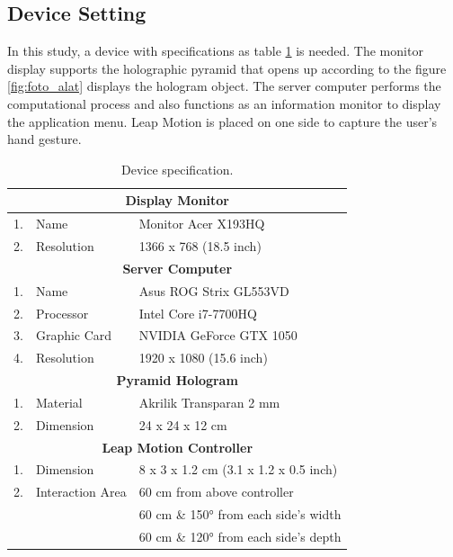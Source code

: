 \documentclass[conference]{IEEEtran}
\begin{document}
	\subsection{Device Setting}
		In this study, a device with specifications as table \ref{fig:spesifikasi_alat} is needed. The monitor display supports the holographic pyramid that opens up according to the figure \ref{fig:foto_alat} displays the hologram object. The server computer performs the computational process and also functions as an information monitor to display the application menu. Leap Motion is placed on one side to capture the user's hand gesture.
		\vspace{-2ex}
		\begin{table}[h]
			\caption{Device specification.}
			\label{fig:spesifikasi_alat}
			\vspace{-2ex}
			\begin{center}
			\begin{tabular}{|l|l|l|}
				\hline
				\multicolumn{3}{|c|}{\textbf{Display Monitor}}                                                       \\ \hline
				1. & Name                  	& Monitor Acer X193HQ                   \\ \hline
				2. & Resolution             & 1366 x 768 (18.5 inch)                \\ \hline
				\multicolumn{3}{|c|}{\textbf{Server Computer}}\\ \hline
				1. & Name                 	& Asus ROG Strix GL553VD                \\ \hline
				2. & Processor			   	& Intel Core i7-7700HQ                  \\ \hline
				3. & Graphic Card			& NVIDIA GeForce GTX 1050               \\ \hline
				4. & Resolution             & 1920 x 1080 (15.6 inch)               \\ \hline
				\multicolumn{3}{|c|}{\textbf{Pyramid Hologram}} \\ \hline
				1. & Material              	& Akrilik Transparan 2 mm                    \\ \hline
				2. & Dimension              & 24 x 24 x 12 cm                        \\ \hline
				\multicolumn{3}{|c|}{\textbf{Leap Motion Controller}}\\ \hline
				1. & Dimension				& 8 x 3 x 1.2 cm (3.1 x 1.2 x 0.5 inch) \\ \hline
				2. & Interaction Area		& 60 cm from above controller  \\ \cline{3-3} 
				   &                       & 60 cm \& 150° from each side's width \\ \cline{3-3} 
				   &                       & 60 cm \& 120° from each side's depth\\ \hline
			\end{tabular}
			\end{center}
		\end{table}
\end{document}
